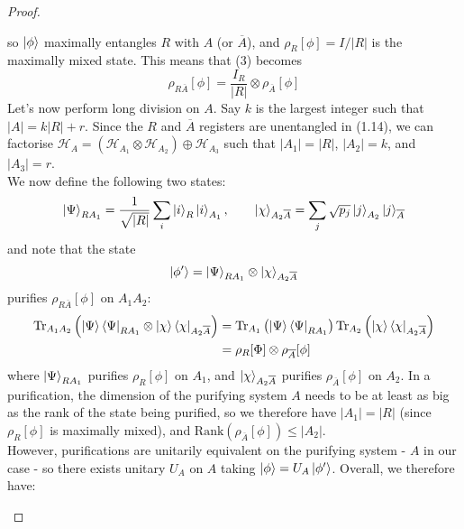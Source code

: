 \documentclass[12pt,a4paper]{article}
\numberwithin{equation}{section}
\newcommand{\ketbra}[2]{\ket{#1}\bra{#2}}
\newcommand{\ketbras}[1]{\ketbra{#1}{#1}}
\begin{document}
\begin{itemize}
\begin{proof}
\begin{itemize}
\begin{equation}
				\end{equation}
				so $\ket{\phi}$ maximally entangles $R$ with $A$ (or $\overline{A}$), and $\rho_{R}[\phi]=I/|R|$ is the maximally mixed state. This means that (3) becomes
				\begin{equation}
					\rho_{R\overline{A}}[\phi]=\frac{I_{R}}{|R|}\otimes\rho_{\overline{A}}[\phi]
				\end{equation}
				Let's now perform long division on $A$. Say $k$ is the largest integer such that $|A|=k|R|+r$. Since the $R$ and $\overline{A}$ registers are unentangled in (1.14), we can factorise $\mathcal{H}_{A}=\left(\mathcal{H}_{A_{1}}\otimes\mathcal{H}_{A_{2}}\right)\oplus\mathcal{H}_{A_{3}}$ such that $|A_{1}|=|R|$, $|A_{2}|=k$, and $|A_{3}|=r$.\\
				We now define the following two states:
				\begin{equation}
					\ket{\Psi}_{RA_{1}}=\frac{1}{\sqrt{|R|}}\sum_{i}\ket{i}_{R}\ket{i}_{A_{1}},\qquad\ket{\chi}_{A_{2}\overline{A}}=\sum_{j}\sqrt{p_{j}}\ket{j}_{A_{2}}\ket{j}_{\overline{A}}
				\end{equation}
				and note that the state
				\begin{equation}
					\ket{\phi'}=\ket{\Psi}_{RA_{1}}\otimes\ket{\chi}_{A_{2}\overline{A}}
				\end{equation}
				purifies $\rho_{R\overline{A}}[\phi]$ on $A_{1}A_{2}$:
				\begin{equation}
					\begin{aligned}
						\text{Tr}_{A_{1}A_{2}}\left(\ketbras{\Psi}_{RA_{1}}\otimes\ketbras{\chi}_{A_{2}\overline{A}}\right)&=\text{Tr}_{A_{1}}\left(\ketbras{\Psi}_{RA_{1}}\right)\text{Tr}_{A_{2}}\left(\ketbras{\chi}_{A_{2}\overline{A}}\right)\\&=\rho_{R}[\Phi]\otimes\rho_{\overline{A}}[\phi]
					\end{aligned}
				\end{equation}
				where $\ket{\Psi}_{RA_{1}}$ purifies $\rho_{R}[\phi]$ on $A_{1}$, and $\ket{\chi}_{A_{2}\overline{A}}$ purifies $\rho_{\overline{A}}[\phi]$ on $A_{2}$. In a purification, the dimension of the purifying system $A$ needs to be at least as big as the rank of the state being purified, so we therefore have $|A_{1}|=|R|$ (since $\rho_{R}[\phi]$ is maximally mixed), and $\text{Rank}\left(\rho_{\overline{A}}[\phi]\right)\leq|A_{2}|$.\\
				However, purifications are unitarily equivalent on the purifying system - $A$ in our case - so there exists unitary $U_{A}$ on $A$ taking $\ket{\phi}=U_{A}\ket{\phi'}$. Overall, we therefore have:

\end{itemize}
\end{proof}
\end{itemize}
\end{document}
